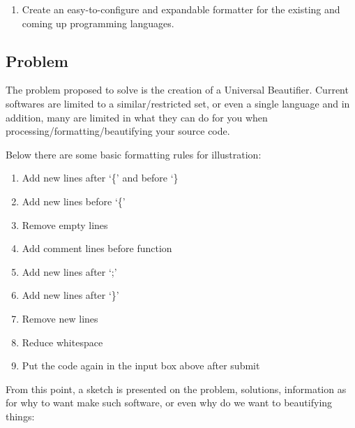 \begin{englishtext}
    \medskip
    \begin{bluebox}
    \begin{enumerate}[nolistsep]
        \item Create an easy-to-configure and expandable formatter for the
        existing and coming up programming languages.
    \end{enumerate}
    \end{bluebox}



\subsection{Problem}

    The problem proposed to solve is the creation of a Universal Beautifier.
    Current softwares are limited to a similar/restricted set, or even a single
    language and in addition, many are limited in what they can do for you when
    processing/formatting/beautifying your source code.
    \cite{universalCodeFormatter}

    Below there are some basic formatting rules for illustration:

    \medskip
    \begin{bluebox}
    \begin{enumerate}
        \item Add new lines after `\{' and before `\}
        \item Add new lines before `\{'
        \item Remove empty lines
        \item Add comment lines before function
        \item Add new lines after `;'
        \item Add new lines after `\}'
        \item Remove new lines
        \item Reduce whitespace
        \item Put the code again in the input box above after submit
    \end{enumerate}
    \end{bluebox}
    \vspace{-4mm}\begin{flushright}\textcite{prettyPrinter}\end{flushright}

    From this point, a sketch is presented on the problem, solutions,
    information as for why to want make such software, or even why do we want to
    beautifying things:


\end{englishtext}
